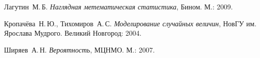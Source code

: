 \begin{thebibliography}{0}
	 Лагутин~М.\,Б.
	\emph{Наглядная метематическая статистика}, Бином. М.: 2009.
	
	 Кропачёва~Н.\,Ю., Тихомиров~А.\,С.
	\emph{Моделирование случайных величин}, НовГУ им. Ярослава
     Мудрого. Великий Новгород: 2004.

	 Ширяев~А.\,Н.
	\emph{Вероятность}, МЦНМО. М.: 2007.
\end{thebibliography}